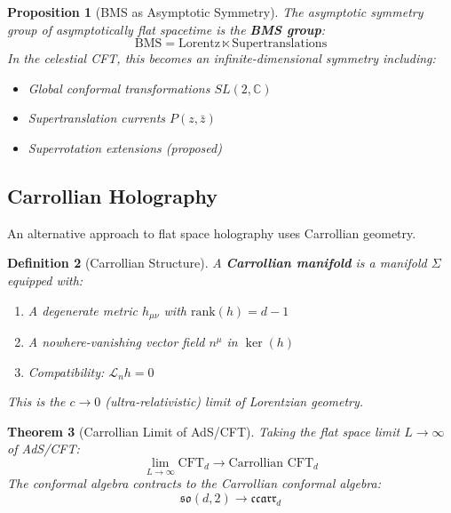 \documentclass[12pt,a4paper]{article}
\newtheorem{theorem}{Theorem}[section]
\newtheorem{definition}[theorem]{Definition}
\newtheorem{proposition}[theorem]{Proposition}
\begin{document}
\begin{proposition}[BMS as Asymptotic Symmetry]
The asymptotic symmetry group of asymptotically flat spacetime is the \textbf{BMS group}:
\begin{equation}
\text{BMS} = \text{Lorentz} \ltimes \text{Supertranslations}
\end{equation}
In the celestial CFT, this becomes an infinite-dimensional symmetry including:
\begin{itemize}
    \item Global conformal transformations $SL(2, \mathbb{C})$
    \item Supertranslation currents $P(z, \bar{z})$
    \item Superrotation extensions (proposed)
\end{itemize}
\end{proposition}

\subsection{Carrollian Holography}

An alternative approach to flat space holography uses Carrollian geometry.

\begin{definition}[Carrollian Structure]
A \textbf{Carrollian manifold} is a manifold $\Sigma$ equipped with:
\begin{enumerate}
    \item A degenerate metric $h_{\mu\nu}$ with $\text{rank}(h) = d - 1$
    \item A nowhere-vanishing vector field $n^\mu$ in $\ker(h)$
    \item Compatibility: $\mathcal{L}_n h = 0$
\end{enumerate}
This is the $c \to 0$ (ultra-relativistic) limit of Lorentzian geometry.
\end{definition}

\begin{theorem}[Carrollian Limit of AdS/CFT]
Taking the flat space limit $L \to \infty$ of AdS/CFT:
\begin{equation}
\lim_{L \to \infty} \text{CFT}_d \to \text{Carrollian CFT}_d
\end{equation}
The conformal algebra contracts to the Carrollian conformal algebra:
\begin{equation}
\mathfrak{so}(d, 2) \to \mathfrak{ccarr}_d
\end{equation}
\end{theorem}
\end{document}
